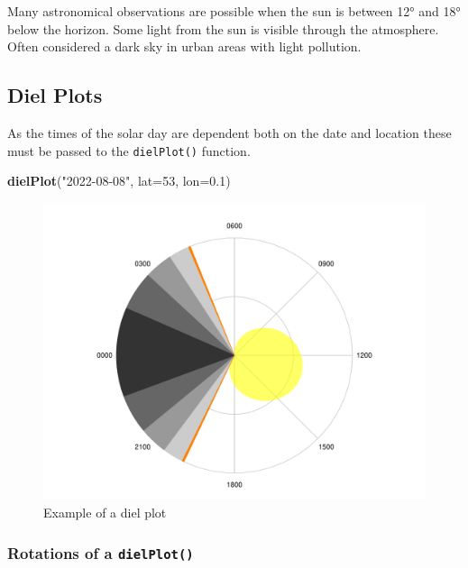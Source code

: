 \documentclass[
]{book}
\newenvironment{Shaded}{\begin{snugshade}}{\end{snugshade}}
\newcommand{\AttributeTok}[1]{\textcolor[rgb]{0.13,0.29,0.53}{#1}}
\newcommand{\DecValTok}[1]{\textcolor[rgb]{0.00,0.00,0.81}{#1}}
\newcommand{\FloatTok}[1]{\textcolor[rgb]{0.00,0.00,0.81}{#1}}
\newcommand{\FunctionTok}[1]{\textcolor[rgb]{0.13,0.29,0.53}{\textbf{#1}}}
\newcommand{\NormalTok}[1]{#1}
\newcommand{\StringTok}[1]{\textcolor[rgb]{0.31,0.60,0.02}{#1}}
\begin{document}
Many astronomical observations are possible when the sun is between 12° and 18° below the horizon. Some light from the sun is visible through the atmosphere. Often considered a dark sky in urban areas with light pollution.

\hypertarget{diel-plots}{%
\subsection{Diel Plots}\label{diel-plots}}

As the times of the solar day are dependent both on the date and location these must be passed to the \texttt{dielPlot()} function.

\begin{Shaded}
\begin{Highlighting}[]
\FunctionTok{dielPlot}\NormalTok{(}\StringTok{"2022{-}08{-}08"}\NormalTok{, }\AttributeTok{lat=}\DecValTok{53}\NormalTok{, }\AttributeTok{lon=}\FloatTok{0.1}\NormalTok{)}
\end{Highlighting}
\end{Shaded}

\begin{figure}

{\centering \includegraphics[width=0.9\linewidth]{_main_files/figure-latex/diel-plot-1-1} 

}

\caption{Example of a diel plot}\label{fig:diel-plot-1}
\end{figure}

\hypertarget{rotations-of-a-dielplot}{%
\subsubsection{\texorpdfstring{Rotations of a \texttt{dielPlot()}}{Rotations of a dielPlot()}}\label{rotations-of-a-dielplot}}
\end{document}
